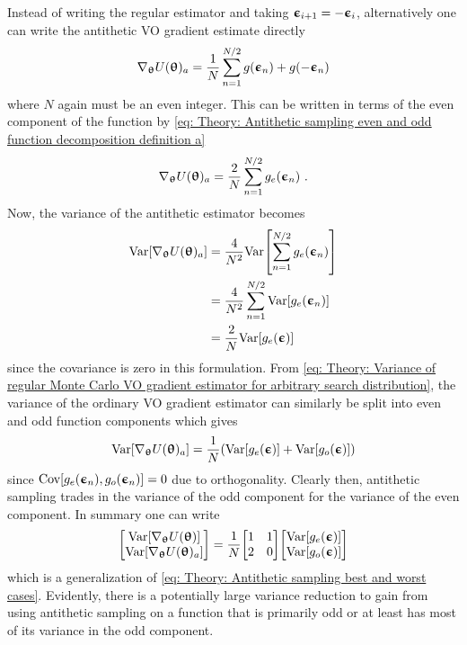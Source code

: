 Instead of writing the regular estimator and taking ${\boldsymbol{\upepsilon}}_{i+1}=-{\boldsymbol{\upepsilon}}_i$, alternatively one can write the antithetic \gls{VO} gradient estimate directly
\begin{equation}\label{eq: Antithetic sampling: direct antitethetic estimate}
    \nabla_{\boldsymbol{\uptheta}} U({\boldsymbol{\uptheta}})_a = \frac{1}{N}\sum_{n=1}^{N/2} g({\boldsymbol{\upepsilon}}_n) + g(-{\boldsymbol{\upepsilon}}_n)
\end{equation}
where $N$ again must be an even integer. This can be written in terms of the even component of the function by \eqref{eq: Theory: Antithetic sampling even and odd function decomposition definition a} 
\begin{equation}
    \nabla_{\boldsymbol{\uptheta}} U({\boldsymbol{\uptheta}})_a = \frac{2}{N}\sum_{n=1}^{N/2} g_e({\boldsymbol{\upepsilon}}_n) \ .
\end{equation}
Now, the variance of the antithetic estimator becomes
\begin{align}
    \text{Var}{\left[\nabla_{\boldsymbol{\uptheta}}U({\boldsymbol{\uptheta}})_a\right]}
    &= \frac{4}{N^2}\text{Var}{\left[\sum_{n=1}^{N/2} g_e({\boldsymbol{\upepsilon}}_n)\right]}\nonumber\\
    &= \frac{4}{N^2}\sum_{n=1}^{N/2} \text{Var}{\left[g_e({\boldsymbol{\upepsilon}}_n)\right]}\nonumber\\
    &= \frac{2}{N}\text{Var}{\left[g_e({\boldsymbol{\upepsilon}})\right]}
\end{align}
since the covariance is zero in this formulation. From \eqref{eq: Theory: Variance of regular Monte Carlo VO gradient estimator for arbitrary search distribution}, the variance of the ordinary \gls{VO} gradient estimator can similarly be split into even and odd function components which gives
\begin{equation}
    \text{Var}{\left[\nabla_{\boldsymbol{\uptheta}}U({\boldsymbol{\uptheta}})_a\right]} = \frac{1}{N}{\left(\text{Var}{\left[g_e({\boldsymbol{\upepsilon}})\right]} + \text{Var}{\left[g_o({\boldsymbol{\upepsilon}})\right]}\right)}
\end{equation}
since $\text{Cov}{\left[g_e({\boldsymbol{\upepsilon}}_n), g_o({\boldsymbol{\upepsilon}}_n)\right]}=0$ due to orthogonality. Clearly then, antithetic sampling trades in the variance of the odd component for the variance of the even component. In summary one can write
\begin{equation}
    {\begin{bmatrix}\text{Var}{\left[\nabla_{\boldsymbol{\uptheta}}U({\boldsymbol{\uptheta}})\right]}\\\text{Var}{\left[\nabla_{\boldsymbol{\uptheta}}U({\boldsymbol{\uptheta}})_a\right]}\end{bmatrix}} = \frac{1}{N}{\begin{bmatrix}1&1\\2&0\end{bmatrix}}{\begin{bmatrix}\text{Var}{\left[g_e({\boldsymbol{\upepsilon}})\right]}\\\text{Var}{\left[g_o({\boldsymbol{\upepsilon}})\right]}\end{bmatrix}}
\end{equation}
which is a generalization of \eqref{eq: Theory: Antithetic sampling best and worst cases}. Evidently, there is a potentially large variance reduction to gain from using antithetic sampling on a function that is primarily odd or at least has most of its variance in the odd component. 

